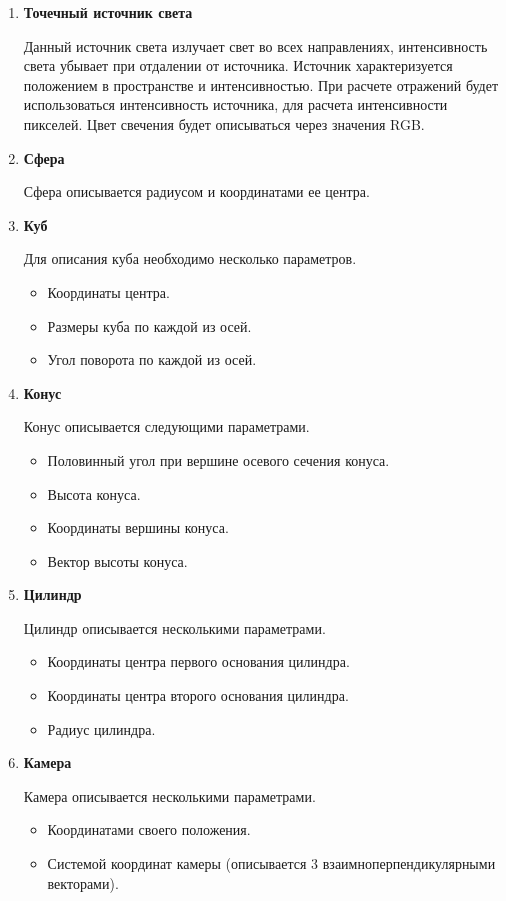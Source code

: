 \begin{enumerate}
	\item  \textbf{Точечный источник света}
	
	Данный источник света излучает свет во всех направлениях, интенсивность света убывает при отдалении от источника.
	Источник характеризуется положением в пространстве и интенсивностью.
	При расчете отражений будет использоваться интенсивность источника, для расчета интенсивности пикселей. Цвет свечения будет описываться через значения RGB.
	
	
	
	\item \textbf{Сфера}
	
	Сфера описывается радиусом и координатами ее центра.
	
	\item  \textbf{Куб}
	
	Для описания куба необходимо несколько параметров.
	\begin{itemize}
		\item Координаты центра.
		\item Размеры куба по каждой из осей.
		\item Угол поворота по каждой из осей.
	\end{itemize}
	\item  \textbf{Конус}
	
	Конус описывается следующими параметрами.
	\begin{itemize}
		\item Половинный угол при вершине осевого сечения конуса.
		\item Высота конуса.
		\item Координаты вершины конуса.
		\item Вектор высоты конуса.
	\end{itemize}
	
	\item  \textbf{Цилиндр}
	
	Цилиндр описывается несколькими параметрами.
	\begin{itemize}
		\item Координаты центра первого основания цилиндра.
		\item Координаты центра второго основания цилиндра.
		\item Радиус цилиндра.
	\end{itemize}
	
	
	\item \textbf{Камера}
	
	Камера описывается несколькими параметрами.
	\begin{itemize}
		\item Координатами своего положения.
		\item Системой координат камеры (описывается 3 взаимноперпендикулярными векторами).
	\end{itemize}
\end{enumerate}

